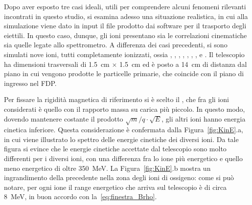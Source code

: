 
Dopo aver esposto tre casi ideali, utili per comprendere alcuni fenomeni rilevanti incontrati in questo studio, si esamina adesso una situazione realistica, in cui alla simulazione \geant{} viene dato in input il file prodotto dai software per il trasporto degli eiettili.
In questo caso, dunque, gli ioni presentano sia le correlazioni cinematiche sia quelle legate allo spettrometro.
A differenza dei casi precedenti, si sono simulati nove ioni, tutti completamente ionizzati, ossia , , , , , , ,  e .
Il telescopio ha dimensioni trasversali di 1.5~cm $\times$ 1.5~cm ed è posto a 14~cm di distanza dal piano in cui vengono prodotte le particelle primarie, che coincide con il piano di ingresso nel FDP.

Per fissare la rigidità magnetica di riferimento si è scelto il , che fra gli ioni considerati è quello con il rapporto massa su carica più piccolo.
In questo modo, dovendo mantenere costante il prodotto $\sqrt{m}/q \cdot \sqrt{E}$, gli altri ioni hanno energia cinetica inferiore.
Questa considerazione è confermata dalla Figura~\ref{fig:KinE}.a, in cui viene illustrato lo spettro delle energie cinetiche dei diversi ioni.
Da tale figura si evince che le energie cinetiche accettate dal telescopio sono molto differenti per i diversi ioni, con una differenza fra lo ione più energetico e quello meno energetico di oltre 350~MeV.
La Figura~\ref{fig:KinE}.b mostra un ingrandimento della precedente nella zona degli ioni di ossigeno: come si può notare, per ogni ione il range energetico che arriva sul telescopio è di circa 8~MeV, in buon accordo con la~\ref{eq:finestra_Brho}.




